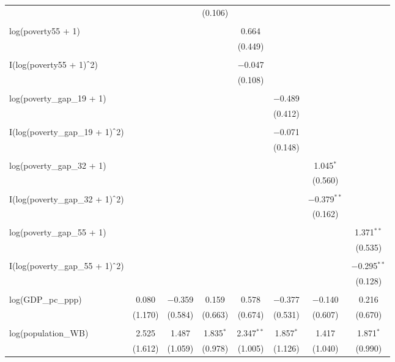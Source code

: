 \documentclass[a4paper, 12pt]{article}
\begin{document}
\begin{table}[!htbp]
{\begin{tabular}{@{\extracolsep{5pt}}lccccccc}
  &  &  & (0.106) &  &  &  &  \\ 
  & & & & & & & \\ 
 log(poverty55 + 1) &  &  &  & 0.664 &  &  &  \\ 
  &  &  &  & (0.449) &  &  &  \\ 
  & & & & & & & \\ 
 I(log(poverty55 + 1)$\hat{\mkern6mu}$2) &  &  &  & $-$0.047 &  &  &  \\ 
  &  &  &  & (0.108) &  &  &  \\ 
  & & & & & & & \\ 
 log(poverty\_gap\_19 + 1) &  &  &  &  & $-$0.489 &  &  \\ 
  &  &  &  &  & (0.412) &  &  \\ 
  & & & & & & & \\ 
 I(log(poverty\_gap\_19 + 1)$\hat{\mkern6mu}$2) &  &  &  &  & $-$0.071 &  &  \\ 
  &  &  &  &  & (0.148) &  &  \\ 
  & & & & & & & \\ 
 log(poverty\_gap\_32 + 1) &  &  &  &  &  & 1.045$^{*}$ &  \\ 
  &  &  &  &  &  & (0.560) &  \\ 
  & & & & & & & \\ 
 I(log(poverty\_gap\_32 + 1)$\hat{\mkern6mu}$2) &  &  &  &  &  & $-$0.379$^{**}$ &  \\ 
  &  &  &  &  &  & (0.162) &  \\ 
  & & & & & & & \\ 
 log(poverty\_gap\_55 + 1) &  &  &  &  &  &  & 1.371$^{**}$ \\ 
  &  &  &  &  &  &  & (0.535) \\ 
  & & & & & & & \\ 
 I(log(poverty\_gap\_55 + 1)$\hat{\mkern6mu}$2) &  &  &  &  &  &  & $-$0.295$^{**}$ \\ 
  &  &  &  &  &  &  & (0.128) \\ 
  & & & & & & & \\ 
 log(GDP\_pc\_ppp) & 0.080 & $-$0.359 & 0.159 & 0.578 & $-$0.377 & $-$0.140 & 0.216 \\ 
  & (1.170) & (0.584) & (0.663) & (0.674) & (0.531) & (0.607) & (0.670) \\ 
  & & & & & & & \\ 
 log(population\_WB) & 2.525 & 1.487 & 1.835$^{*}$ & 2.347$^{**}$ & 1.857$^{*}$ & 1.417 & 1.871$^{*}$ \\ 
  & (1.612) & (1.059) & (0.978) & (1.005) & (1.126) & (1.040) & (0.990) \\ 

\end{tabular}}
\end{table}
\end{document}
